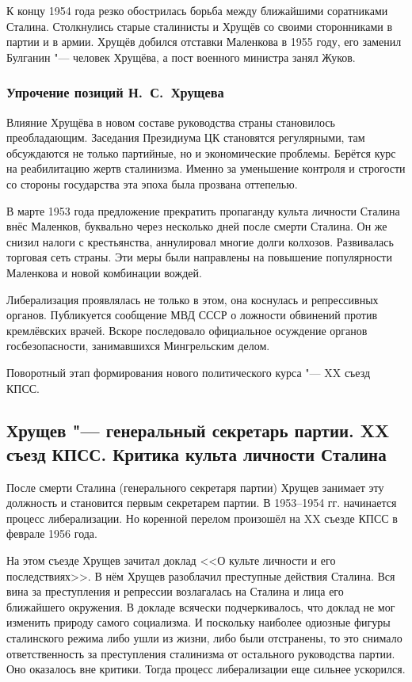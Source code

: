 К концу 1954 года резко обострилась борьба между ближайшими соратниками Сталина. Столкнулись старые сталинисты и Хрущёв со своими сторонниками в партии и в армии. Хрущёв добился отставки Маленкова в 1955 году, его заменил Булганин "--- человек Хрущёва, а пост военного министра занял Жуков.

\subsubsection{Упрочение позиций Н.~С.~Хрущева}

Влияние Хрущёва в новом составе руководства страны становилось преобладающим. Заседания Президиума ЦК становятся регулярными, там обсуждаются не только партийные, но и экономические проблемы. Берётся курс на реабилитацию жертв сталинизма. Именно за уменьшение контроля и строгости со стороны государства эта эпоха была прозвана оттепелью.

В марте 1953 года предложение прекратить пропаганду культа личности Сталина внёс Маленков, буквально через несколько дней после смерти Сталина. Он же снизил налоги с крестьянства, аннулировал многие долги колхозов. Развивалась торговая сеть страны. Эти меры были направлены на повышение популярности Маленкова и новой комбинации вождей.

Либерализация проявлялась не только в этом, она коснулась и репрессивных органов. Публикуется сообщение МВД СССР о ложности обвинений против кремлёвских врачей. Вскоре последовало официальное осуждение органов госбезопасности, занимавшихся Мингрельским делом.

Поворотный этап формирования нового политического курса "--- XX съезд КПСС.

\subsection{Хрущев "--- генеральный секретарь партии. XX съезд КПСС. Критика культа личности Сталина}

После смерти Сталина (генерального секретаря партии) Хрущев занимает эту должность и становится первым секретарем партии.
В 1953--1954 гг. начинается процесс либерализации. Но коренной перелом произошёл на XX съезде КПСС в феврале 1956 года. 

На этом съезде Хрущев зачитал доклад <<О культе личности и его последствиях>>. В нём Хрущев разоблачил преступные действия Сталина. Вся вина за преступления и репрессии возлагалась на Сталина и лица его ближайшего окружения. В докладе всячески подчеркивалось, что доклад не мог изменить природу самого социализма. И поскольку наиболее одиозные фигуры сталинского режима либо ушли из жизни, либо были отстранены, то это снимало ответственность за преступления сталинизма от остального руководства партии. Оно оказалось вне критики. Тогда процесс либерализации еще сильнее ускорился.


